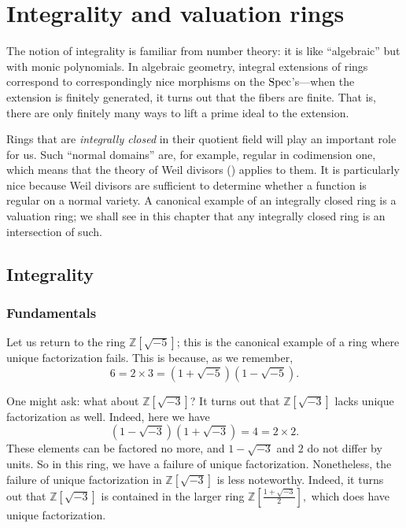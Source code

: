 \chapter{Integrality and valuation rings}

The notion of integrality is familiar from number theory: it is like
``algebraic'' but with monic polynomials. In algebraic geometry, integral
extensions of rings correspond to correspondingly nice morphisms on the
$\operatorname{Spec}$'s---when the extension is finitely generated, it turns out that the
fibers are finite. That is, there are only finitely many ways to lift a prime
ideal to the extension.

Rings that are \emph{integrally closed} in their quotient field will play an
important role for us. Such ``normal domains'' are, for example, regular in
codimension one, which means that the theory of Weil divisors (\rref{}) applies
to them. It is particularly nice because Weil divisors are sufficient to
determine whether a function is regular on a normal variety.
A canonical example of an integrally closed ring is a valuation ring; we shall
see in this chapter that any integrally closed ring is an intersection of such.

\section{Integrality}

\subsection{Fundamentals}

Let us return to the ring $\mathbb{Z}[\sqrt{-5}]$; this is the canonical
example of a ring where unique factorization fails. This is because, as we
remember,
\[ 6 = 2 \times 3 = (1+\sqrt{-5})(1-\sqrt{-5}).  \]

One might ask: what about $\mathbb{Z}[\sqrt{-3}]$? It turns out that
$\mathbb{Z}[\sqrt{-3}]$ lacks unique factorization as well. Indeed, here we have
\[ (1 - \sqrt{-3})(1+\sqrt{-3}) = 4 = 2 \times 2.  \]
These elements can be factored no more, and $1 - \sqrt{-3}$ and $2$ do not
differ by units.
So in this ring, we have a failure of unique factorization. Nonetheless, the
failure of unique factorization in $\mathbb{Z}[\sqrt{-3}]$ is less
noteworthy. Indeed, it turns out that $\mathbb{Z}[\sqrt{-3}]$ is
contained in the larger ring
\( \mathbb{Z}\left[ \frac{1 + \sqrt{-3}}{2}\right],  \)
which does have unique factorization.

